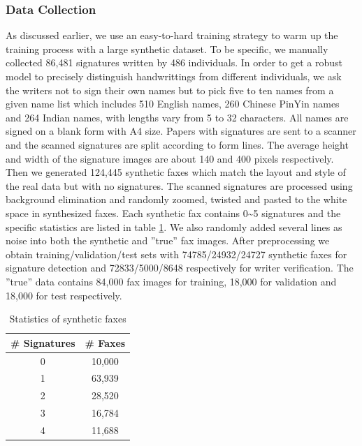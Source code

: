 \documentclass[sigconf]{acmart}
\begin{document}
\subsubsection*{\rm \textbf{Data Collection}}
As discussed earlier, we use an easy-to-hard training strategy to warm up the training process with a large synthetic dataset. To be specific, we manually collected 86,481 signatures written by 486 individuals. In order to get a robust model to precisely distinguish handwrittings from different individuals, we ask the writers not to sign their own names but to pick five to ten names from a given name list which includes 510 English names, 260 Chinese PinYin names and 264 Indian names, with lengths vary from 5 to 32 characters. All names are signed on a blank form with A4 size. Papers with signatures are sent to a scanner and the scanned signatures are split according to form lines. The average height and width of the signature images are about 140 and 400 pixels respectively. Then we generated 124,445 synthetic faxes which match the layout and style of the real data but with no signatures. The scanned signatures are processed using background elimination and randomly zoomed, twisted and pasted to the white space in synthesized faxes. Each synthetic fax contains 0\textasciitilde5 signatures and the specific statistics are listed in table \ref{stat sig}. We also randomly added several lines as noise into both the synthetic and ''true'' fax images. After preprocessing we obtain training/validation/test sets with 74785/24932/24727 synthetic faxes for signature detection and 72833/5000/8648 respectively for writer verification. The ''true'' data contains 84,000 fax images for training, 18,000 for validation and 18,000 for test respectively.
\begin{table}
	\caption{Statistics of synthetic faxes}
	\label{stat sig}
	\centering
	\begin{tabular}{cc}
		\toprule
		\textbf{\# Signatures} & \textbf{\# Faxes}\\
		\midrule
		0 & 10,000 \\
		1 & 63,939 \\
		2 & 28,520 \\
		3 & 16,784 \\
		4 & 11,688 \\
		\bottomrule
	\end{tabular}
\end{table}
\end{document}
